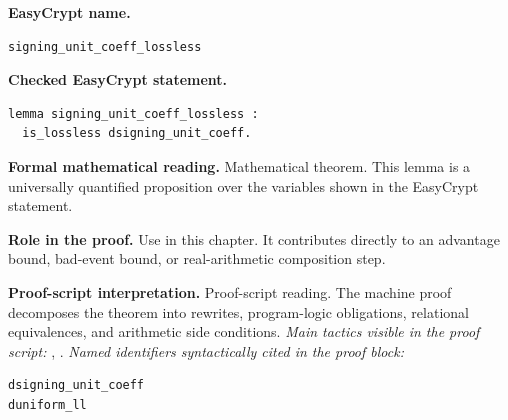\begin{formaltheorem}
\noindent\textbf{EasyCrypt name.}
\begin{lstlisting}[language=EasyCrypt,basicstyle=\ttfamily\scriptsize]
signing_unit_coeff_lossless
\end{lstlisting}
\noindent\textbf{Checked EasyCrypt statement.}
\begin{lstlisting}[language=EasyCrypt,basicstyle=\ttfamily\scriptsize]
lemma signing_unit_coeff_lossless :
  is_lossless dsigning_unit_coeff.
\end{lstlisting}
\noindent\textbf{Formal mathematical reading.}
Mathematical theorem. This lemma is a universally quantified proposition over the variables shown in the EasyCrypt statement.

\noindent\textbf{Role in the proof.}
Use in this chapter. It contributes directly to an advantage bound, bad-event bound, or real-arithmetic composition step.

\noindent\textbf{Proof-script interpretation.}
Proof-script reading. The machine proof decomposes the theorem into rewrites, program-logic obligations, relational equivalences, and arithmetic side conditions.
\emph{Main tactics visible in the proof script:} , .
\emph{Named identifiers syntactically cited in the proof block:}
\begin{lstlisting}[language=EasyCrypt,basicstyle=\ttfamily\scriptsize]
dsigning_unit_coeff
duniform_ll
\end{lstlisting}

\end{formaltheorem}

